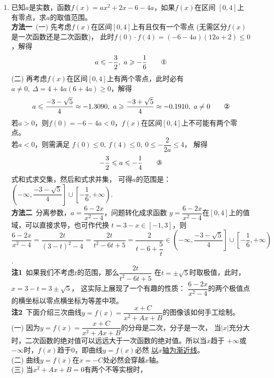 \begin{enumerate}[label={【\textbf{例\thechapter.\arabic*}】},
 leftmargin=\inteval{\myenumleftmargin}pt,
 itemsep=\inteval{\myenumitempsep}pt,
 itemindent=\inteval{\myenumitemindent}pt]
\item 已知$ a $是实数，函数$ f(x)=ax^2+2x-6-4a $，如果$ f(x) $在区间
$ [0,4] $上有零点，求$ a $的取值范围。 \\
\textbf{方法一}\ 
(一) 先考虑$ f(x) $在区间$ [0,4] $上有且仅有一个零点
(无需区分$f(x)$是一次函数还是二次函数)，
此时$ f(0)\cdot f(4)=(-6-4a)(12a+2)\leq 0 $，解得
\begin{gather} 
    a\leq -\dfrac{3}{2},\ a\geq -\dfrac{1}{6} \tag*{\ding{172}}
\end{gather}
(二) 再考虑$ f(x) $在区间$ [0,4] $上有两个零点，此时必有
$ a\neq 0,\ \Delta=4+4a(6+4a)\geq 0 $，解得
\begin{gather} 
    a\leq\dfrac{-3-\sqrt{5}}{4}\approx -1.3090,\ a\geq\dfrac{-3+\sqrt{5}}{4}
    \approx -0.1910,\ a\neq 0  \tag*{\ding{173}}
\end{gather}
若$ a>0 $，则$ f(0)=-6-4a<0 $，$ f(x) $在区间$ [0,4] $上不可能有两个零点。\\
若$ a<0 $，则需满足 $ f(0)\leq 0,\ f(4)\leq 0,\ 0\leq -\dfrac{2}{2a} \leq 4 $，
解得
\begin{gather} 
    -\dfrac{3}{2} \leq a \leq -\dfrac{1}{4} \tag*{\ding{174}}
\end{gather}
式和式求交集，然后和式求并集，
可得$ a $的范围是：
$ \left(-\infty,\dfrac{-3-\sqrt{5}}{4}\right]\cup 
\left[-\dfrac{1}{6},+\infty \right) $. 
\\ 
\textbf{方法二}\ 分离参数，$ a=\dfrac{6-2x}{x^2-4} $，问题转化成求函数
$ y=\dfrac{6-2x}{x^2-4} $在$ [0,4] $上的值域，可以直接求导，也可作代换
$ t=3-x\in[-1,3] $，则$ \dfrac{6-2x}{x^2-4}=\dfrac{2t}{(3-t)^2-4}=
\dfrac{2t}{t^2-6t+5}=\dfrac{2}{t-6+\dfrac{5}{t}} \in 
\left(-\infty,\dfrac{-3-\sqrt{5}}{4}\right]\cup 
\left[-\dfrac{1}{6},+\infty \right) $. \\
\textbf{注1}\ 如果我们不考虑$t$的范围，那么$\dfrac{2t}{t^2-6t+5}$
在$t=\pm \sqrt{5}$时取极值，此时，$x=3-t=3\pm\sqrt{5}$，
这实际上展现了一个有趣的性质：
$\dfrac{6-2x}{x^2-4} $的两个极值点的横坐标以零点横坐标为等差中项。\\
\textbf{注2}\ 下面介绍三次曲线$y=f(x)=\dfrac{x+C}{x^2+Ax+B}$的图像该如何手工绘制。\\
(一) 因为$y=f(x)=\dfrac{x+C}{x^2+Ax+B}$的分母是二次，分子是一次，
当$|x|$充分大时，二次函数的绝对值可以远远大于一次函数的绝对值。所以当$x$趋于
$+\infty$或$-\infty$时，$f(x)$趋于0，即曲线$y=f(x)$必然
\underline{以$x$轴为渐近线}。\\
(二) 曲线$y=f(x)$在$x=-C$处必然会穿越$x$轴。\\
(三) 当$x^2+Ax+B=0$有两个不等实根时，

\end{enumerate}
